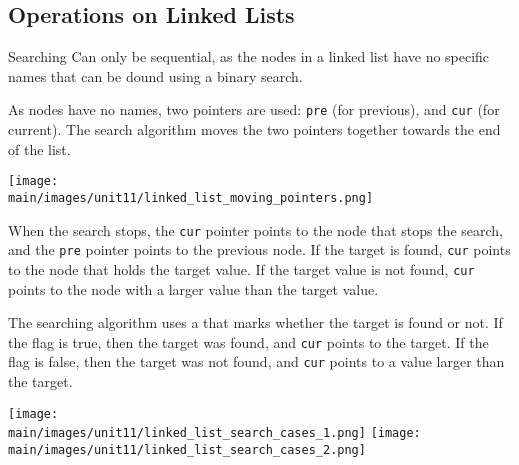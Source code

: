\documentclass[\main/notes.tex]{subfiles}
\begin{document}
			\subsection{Operations on Linked Lists}
				\begin{definition}{Searching}
					Can only be sequential, as the nodes in a linked list have no specific names that can be dound using a binary search.

					As nodes have no names, two pointers are used: \texttt{pre} (for previous), and \texttt{cur} (for current). The search algorithm moves the two pointers together towards the end of the list.
					\begin{center}
						\texttt{[image: \\main/images/unit11/linked\_list\_moving\_pointers.png]}
					\end{center}

					When the search stops, the \texttt{cur} pointer points to the node that stops the search, and the \texttt{pre} pointer points to the previous node. If the target is found, \texttt{cur} points to the node that holds the target value. If the target value is not found, \texttt{cur} points to the node with a larger value than the target value.

					The searching algorithm uses a  that marks whether the target is found or not. If the flag is true, then the target was found, and \texttt{cur} points to the target. If the flag is false, then the target was not found, and \texttt{cur} points to a value larger than the target.

					\begin{center}
						\texttt{[image: \\main/images/unit11/linked\_list\_search\_cases\_1.png]}
						\texttt{[image: \\main/images/unit11/linked\_list\_search\_cases\_2.png]}
					\end{center}
				\end{definition}
\end{document}
